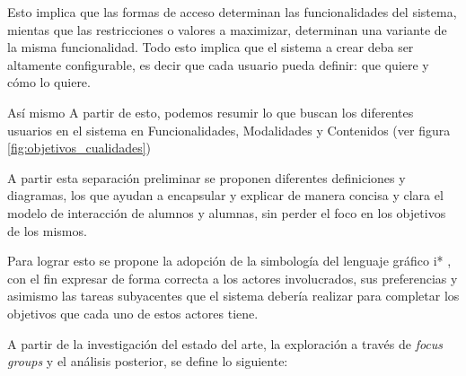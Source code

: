         \par Esto implica que las formas de acceso determinan las funcionalidades del sistema, mientas que las restricciones o valores a maximizar, determinan una variante de la misma funcionalidad. Todo esto implica que el sistema a crear deba ser altamente configurable, es decir que cada usuario pueda definir: que quiere y cómo lo quiere.

        \par  Así mismo  A partir de esto, podemos resumir lo que buscan los diferentes usuarios en el sistema en Funcionalidades, Modalidades y Contenidos (ver figura \ref{fig:objetivos_cualidades})

        \par A partir esta separación preliminar se proponen diferentes definiciones y diagramas, los que ayudan a encapsular y explicar de manera concisa y clara el modelo de interacción de alumnos y alumnas, sin perder el foco en los objetivos de los mismos.
        \par Para lograr esto se propone la adopción de la simbología del lenguaje gráfico \gls{i*} \cite{Dalpiaz2016}, con el fin expresar de forma correcta a los actores involucrados, sus preferencias y asimismo las tareas subyacentes que el sistema debería realizar para completar los objetivos que cada uno de estos actores tiene.
        \par A partir de la investigación del estado del arte, la exploración a través de \textit{focus groups} y el análisis posterior, se define lo siguiente:
        
